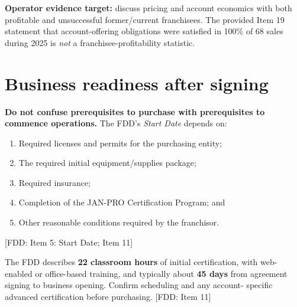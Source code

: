 \documentclass[10pt,letterpaper]{article}
\newcommand{\FDD}[1]{\textsf{\footnotesize\color{Muted} [FDD: #1]}}
\begin{document}
\begin{successBox}
\textbf{Operator evidence target:} discuss pricing and account economics with
both profitable and unsuccessful former/current franchisees. The provided Item
19 statement that account-offering obligations were satisfied in 100\% of 68
sales during 2025 is \emph{not} a franchisee-profitability statistic.
\end{successBox}

\section{Business readiness after signing}
\textbf{Do not confuse prerequisites to purchase with prerequisites to
commence operations.} The FDD's \emph{Start Date} depends on:
\begin{enumerate}
 \item Required licenses and permits for the purchasing entity;
 \item The required initial equipment/supplies package;
 \item Required insurance;
 \item Completion of the JAN-PRO Certification Program; and
 \item Other reasonable conditions required by the franchisor.
\end{enumerate}
\FDD{Item 5: Start Date; Item 11}

The FDD describes \textbf{22 classroom hours} of initial certification,
with web-enabled or office-based training, and typically about \textbf{45 days}
from agreement signing to business opening. Confirm scheduling and any account-
specific advanced certification before purchasing. \FDD{Item 11}
\end{document}
